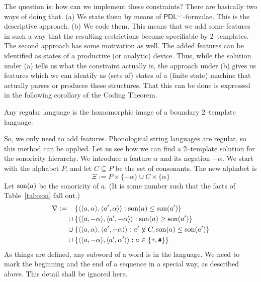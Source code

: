 The question is: how can we implement these constraints?  There are 
basically two ways of doing that. (a) We state
them by means of $\mathsf{PDL}^{\smallsmile}$--formulae.
This is the descriptive approach. (b) We code them.
This means that we add some features in such a way that the
resulting restrictions become specifiable by 2--templates.
The second approach has some motivation as well. The added
features can be identified as states of a productive (or analytic)
device. Thus, while the solution under (a) tells us what the
constraint actually is, the approach under (b) gives us features
which we can identify as (sets of) states of a (finite state)
machine that actually parses or produces these structures.
That this can be done is expressed in the following corollary of 
the Coding Theorem.
\begin{thm}
Any regular language is the homomorphic image of a boundary
2--template language.
\end{thm}
So, we only need to add features. Phonological string languages
are regular, so this method can be applied. Let us see how we can
find a 2--template solution for the sonoricity hierarchy. We introduce a
feature $\alpha$ and its negation $- \alpha$. We start with the
alphabet $P$, and let $C \subseteq P$ be the set of consonants.
The new alphabet is
\begin{equation}
\Xi := P \times \{-\alpha\} \cup C \times \{\alpha\}
\end{equation}
Let $\operatorname{son}(a)$ be the sonoricity of $a$. (It is some number such 
that the facts of Table~\ref{tab:son} fall out.)
\begin{equation}
\begin{split}
\nabla := & \phantom{\mbox{}\cup\mbox{}}
\{\auf\auf a, \alpha\zu, \auf a', \alpha\zu\zu :
                \son(a) \leq \son(a')\}  \\
        & \cup \{\auf\auf a, -\alpha\zu, \auf a', -\alpha\zu\zu :
                \son(a) \geq \son(a')\} \\
        & \cup \{\auf\auf a, \alpha\zu, \auf a', -\alpha\zu\zu :
                a' \not\in C, \son(a) \leq \son(a')\} \\
        & \cup \{\auf\auf a, -\alpha\zu, \auf a', \alpha'\zu\zu :
                a \in \{\mbox{\tt +},\mbox{\tt \#}\}\}
\end{split}
\end{equation}
As things are defined, any subword of a word is in the language. We need
to mark the beginning and the end of a sequence in a special way, as
described above. This detail shall be ignored here.

